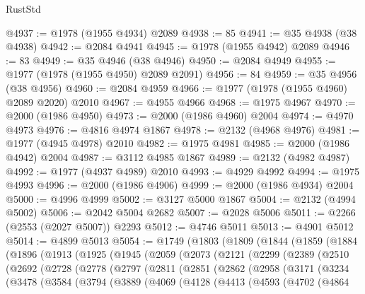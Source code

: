 \begin{lexlean}{RustStd}
\begin{coremodule}
@4937 := @1978 (@1955 @4934) @2089
@4938 := 85
@4941 := @35 @4938 (@38 @4938)
@4942 := @2084 @4941
@4945 := @1978 (@1955 @4942) @2089
@4946 := 83
@4949 := @35 @4946 (@38 @4946)
@4950 := @2084 @4949
@4955 := @1977 (@1978 (@1955 @4950) @2089 @2091)
@4956 := 84
@4959 := @35 @4956 (@38 @4956)
@4960 := @2084 @4959
@4966 := @1977 (@1978 (@1955 @4960) @2089 @2020) @2010
@4967 := @4955 @4966
@4968 := @1975 @4967
@4970 := @2000 (@1986 @4950)
@4973 := @2000 (@1986 @4960) @2004
@4974 := @4970 @4973
@4976 := @4816 @4974 @1867
@4978 := @2132 (@4968 @4976)
@4981 := @1977 (@4945 @4978) @2010
@4982 := @1975 @4981
@4985 := @2000 (@1986 @4942) @2004
@4987 := @3112 @4985 @1867
@4989 := @2132 (@4982 @4987)
@4992 := @1977 (@4937 @4989) @2010
@4993 := @4929 @4992
@4994 := @1975 @4993
@4996 := @2000 (@1986 @4906)
@4999 := @2000 (@1986 @4934) @2004
@5000 := @4996 @4999
@5002 := @3127 @5000 @1867
@5004 := @2132 (@4994 @5002)
@5006 := @2042 @5004 @2682
@5007 := @2028 @5006
@5011 := @2266 (@2553 (@2027 @5007)) @2293
@5012 := @4746 @5011
@5013 := @4901 @5012
@5014 := @4899 @5013
@5054 := @1749
    (@1803
      (@1809
        (@1844
          (@1859
            (@1884
              (@1896
                (@1913
                  (@1925
                    (@1945
                      (@2059
                        (@2073
                          (@2121
                            (@2299
                              (@2389
                                (@2510
                                  (@2692
                                    (@2728
                                      (@2778
                                        (@2797
                                          (@2811
                                            (@2851
                                              (@2862
                                                (@2958
                                                  (@3171
                                                    (@3234
                                                      (@3478
                                                        (@3584
                                                          (@3794
                                                            (@3889
                                                              (@4069
                                                                (@4128
                                                                  (@4413
                                                                    (@4593
                                                                      (@4702
                                                                        (@4864

\end{coremodule}
\end{lexlean}
